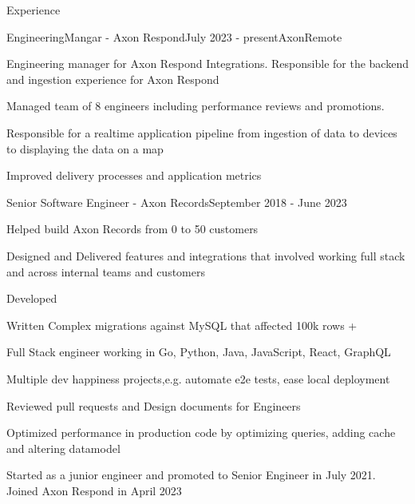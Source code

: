 \documentclass{resume} %
\begin{document}
\begin{rSection}{Experience}

\begin{rSubsection}{EngineeringMangar - Axon Respond}{July 2023 - present}{Axon}{Remote}
\item Engineering manager for Axon Respond Integrations. Responsible for the backend and ingestion experience for Axon Respond
\item Managed team of 8 engineers including performance reviews and promotions.
\item Responsible for a realtime application pipeline from ingestion of data to devices to displaying the data on a map
\item Improved delivery processes and application metrics

\end{rSubsection}

\begin{rSubsection}{Senior Software Engineer - Axon Records}{September 2018 - June 2023}{}{}
\item Helped build Axon Records from 0 to 50 customers
\item Designed and Delivered features and integrations that involved working full stack and across internal teams and customers
\item Developed 
\item Written Complex migrations against MySQL that affected 100k rows + 
\item Full Stack engineer working in Go, Python, Java, JavaScript, React, GraphQL
\item Multiple dev happiness projects,e.g. automate e2e tests, ease local deployment
\item Reviewed pull requests and Design documents for Engineers
\item Optimized performance in production code by optimizing queries, adding cache and altering datamodel
\item Started as a junior engineer and promoted to Senior Engineer in July 2021. Joined Axon Respond in April 2023

\end{rSubsection}


\end{rSection}
\end{document}
